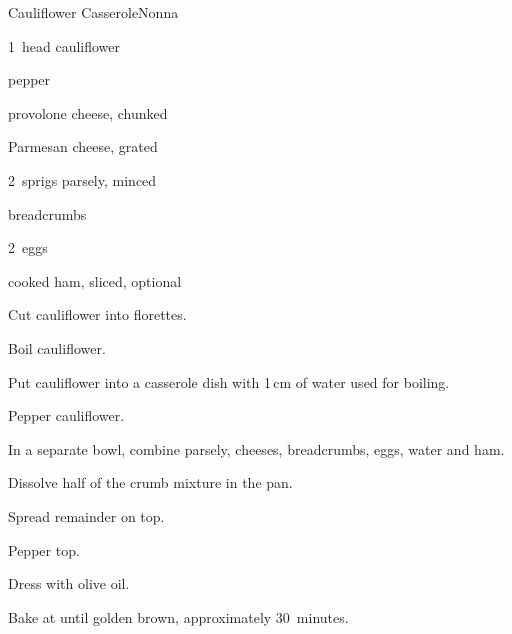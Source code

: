 \begin{recipe}{Cauliflower Casserole}{Nonna}{}

\begin{ingredients}
\item 1~head cauliflower
\item pepper
\item \C{\half} provolone cheese, chunked
\item \C{\half} Parmesan cheese, grated
\item 2~sprigs parsely, minced
\item \C{\threequarter} breadcrumbs
\item 2~eggs
\item \C{\quarter} cooked ham, sliced, optional
\end{ingredients}

\begin{directions}
\item Cut cauliflower into florettes.
\item Boil cauliflower.
\item Put cauliflower into a casserole dish with 1\,cm of water used for boiling.
\item Pepper cauliflower.
\item In a separate bowl, combine parsely, cheeses, breadcrumbs, eggs, \C{\quarter} water and ham.
\item Dissolve half of the crumb mixture in the pan.
\item Spread remainder on top.
\item Pepper top.
\item Dress with olive oil.
\item Bake at  until golden brown, approximately 30~minutes.
\end{directions}

\end{recipe}
